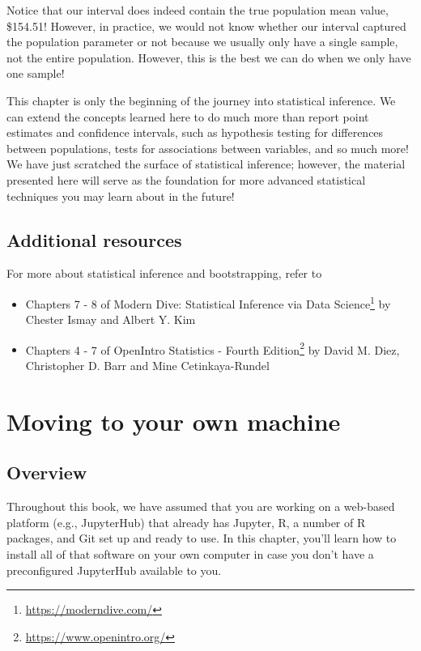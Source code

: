 \documentclass[
]{krantz}
\providecommand{\tightlist}{%
  \setlength{\itemsep}{0pt}\setlength{\parskip}{0pt}}
\renewcommand{\href}[2]{#2\footnote{\url{#1}}}
\begin{document}
Notice that our interval does indeed contain the true
population mean value, \$154.51! However, in
practice, we would not know whether our interval captured the population parameter or not because we usually only have a single sample, not the entire population. However, this is the best we can do when we only have one sample!

This chapter is only the beginning of the journey into statistical inference. We can extend the concepts learned here to do much more than report point estimates and confidence intervals, such as hypothesis testing for differences between populations, tests for associations between variables, and so much more! We have just scratched the surface of statistical inference; however, the material presented here will serve as the foundation for more advanced statistical techniques you may learn about in the future!

\hypertarget{additional-resources-5}{%
\section{Additional resources}\label{additional-resources-5}}

For more about statistical inference and bootstrapping, refer to

\begin{itemize}
\tightlist
\item
  Chapters 7 - 8 of \href{https://moderndive.com/}{Modern Dive: Statistical
  Inference via Data Science} by Chester Ismay and Albert Y. Kim
\item
  Chapters 4 - 7 of \href{https://www.openintro.org/}{OpenIntro Statistics - Fourth Edition} by David M. Diez, Christopher D. Barr and Mine Cetinkaya-Rundel
\end{itemize}

\hypertarget{move-to-your-own-machine}{%
\chapter{Moving to your own machine}\label{move-to-your-own-machine}}

\hypertarget{overview-11}{%
\section{Overview}\label{overview-11}}

Throughout this book, we have assumed that you are working on a web-based platform
(e.g., JupyterHub) that already has Jupyter, R, a number of R packages, and Git set up and ready to use.
In this chapter, you'll learn how to install all of that software on your own computer in case
you don't have a preconfigured JupyterHub available to you.
\end{document}
